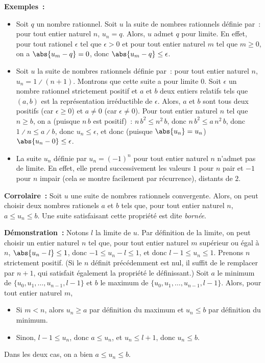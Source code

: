     \done

\medskip

\noindent\textbf{Exemples :} 
\begin{itemize}[nosep]
    \item Soit $q$ un nombre rationnel. 
        Soit $u$ la suite de nombres rationnels définie par : pour tout entier naturel $n$, $u_n = q$.
        Alors, $u$ admet $q$ pour limite.
        En effet, pour tout rationel $\epsilon$ tel que $\epsilon > 0$ et pour tout entier naturel $m$ tel que $m \geq 0$, on a $\abs{u_m - q} = 0$, donc $\abs{u_m - q} \leq \epsilon$.
    \item Soit $u$ la suite de nombres rationnels définie par : pour tout entier naturel $n$, $u_n = 1 \divslash (n+1)$.
        Montrons que cette suite a pour limite $0$. 
        Soit $\epsilon$ un nombre rationnel strictement positif et $a$ et $b$ deux entiers relatifs tels que $(a, b)$ est la représentation irréductible de $\epsilon$.
        Alors, $a$ et $b$ sont tous deux positifs (car $\epsilon \geq 0$) et $a \neq 0$ (car $\epsilon \neq 0$).
        Pour tout entier naturel $n$ tel que $n \geq b$, on a (puisque $n \, b$ est positif) : $n \, b^2 \leq n^2 \, b$, donc $n \, b^2 \leq a \, n^2 \, b$, donc $1 \divslash n \leq a \divslash b$, donc $u_n \leq \epsilon$, et donc (puisque $\abs{u_n} = u_n$) $\abs{u_n - 0} \leq \epsilon$.
    \item La suite $u_n$ définie par $u_n = (-1)^n$ pour tout entier naturel $n$ n'admet pas de limite.
        En effet, elle prend successivement les valeurs $1$ pour $n$ pair et $-1$ pour $n$ impair (cela se montre facilement par récurrence), distants de $2$. 
\end{itemize}

\medskip

\noindent\textbf{Corrolaire :} Soit $u$ une suite de nombres rationnels convergente.
    Alors, on peut choisir deux nombres rationels $a$ et $b$ tels que, pour tout entier naturel $n$, $a \leq u_n \leq b$.
    Une suite satisfaisant cette propriété est dite \emph{bornée}.

\medskip

\noindent\textbf{Démonstration :} Notons $l$ la limite de $u$.
    Par définition de la limite, on peut choisir un entier naturel $n$ tel que, pour tout entier naturel $m$ supérieur ou égal à $n$, $\abs{u_n-l} \leq 1$, donc $-1 \leq u_n-l \leq 1$, et donc $l-1 \leq u_n \leq 1$. 
    Prenons $n$ strictement positif.
    (Si le $n$ définit précédemment est nul, il suffit de le remplacer par $n+1$, qui satisfait également la propriété le définissant.)
    Soit $a$ le minimum de $\lbrace u_0, u_1, \dots, u_{n-1}, l-1 \rbrace$ et $b$ le maximum de $\lbrace u_0, u_1, \dots, u_{n-1}, l-1 \rbrace$.
    Alors, pour tout entier naturel $m$, 
    \begin{itemize}[nosep]
        \item Si $m < n$, alors $u_n \geq a$ par définition du maximum et $u_n \leq b$ par définition du minimum.
        \item Sinon, $l-1 \leq u_n$, donc $a \leq u_n$, et $u_n \leq l+1$, donc $u_n \leq b$.
    \end{itemize}
    Dans les deux cas, on a bien $a \leq u_n \leq b$.

